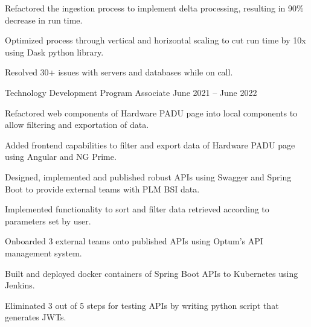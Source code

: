 \begin{cventries}
{\begin{cvitems}
        \item {Refactored the ingestion process to implement delta processing, resulting in 90\% decrease in run time.}
        \item {Optimized process through vertical and horizontal scaling to cut run time by 10x using Dask python library.}
        \item {Resolved 30+ issues with servers and databases while on call.}
      \end{cvitems}
    }
  \cventry
    {Technology Development Program Associate} %
    {} %
    {} %
    {June 2021 – June 2022} %
    {
      \begin{cvitems} %
        \item {Refactored web components of Hardware PADU page into local components to allow filtering and exportation of data.}
        \item {Added frontend capabilities to filter and export data of Hardware PADU page using Angular and NG Prime.}
        \item {Designed, implemented and published robust APIs using Swagger and Spring Boot to provide external teams with PLM BSI data.}
        \item {Implemented functionality to sort and filter data retrieved according to parameters set by user.}
        \item {Onboarded 3 external teams onto published APIs using Optum's API management system.}
        \item {Built and deployed docker containers of Spring Boot APIs to Kubernetes using Jenkins.}
        \item {Eliminated 3 out of 5 steps for testing APIs by writing python script that generates JWTs.}
      \end{cvitems}
    }

\end{cventries}
